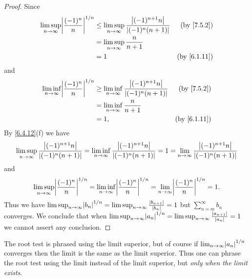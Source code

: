 \begin{proof}
  Since
  \begin{align*}
    \limsup_{n \to \infty} \abs{\frac{(-1)^n}{n}}^{1 / n} & \leq \limsup_{n \to \infty} \frac{\abs{(-1)^{n + 1} n}}{\abs{(-1)^n (n + 1)}} & \text{(by \cref{7.5.2})}  \\
                                                          & = \limsup_{n \to \infty} \frac{n}{n + 1}                                                                  \\
                                                          & = 1                                                                           & \text{(by \cref{6.1.11})}
  \end{align*}
  and
  \begin{align*}
    \liminf_{n \to \infty} \abs{\frac{(-1)^n}{n}}^{1 / n} & \geq \liminf_{n \to \infty} \frac{\abs{(-1)^{n + 1} n}}{\abs{(-1)^n (n + 1)}} & \text{(by \cref{7.5.2})}  \\
                                                          & = \liminf_{n \to \infty} \frac{n}{n + 1}                                                                  \\
                                                          & = 1,                                                                          & \text{(by \cref{6.1.11})}
  \end{align*}
  By \cref{6.4.12}(f) we have
  \[
    \limsup_{n \to \infty} \frac{\left\lvert(-1)^{n + 1} n\right\rvert}{\left\lvert(-1)^n (n + 1)\right\rvert} = \liminf_{n \to \infty} \frac{\left\lvert(-1)^{n + 1} n\right\rvert}{\left\lvert(-1)^n (n + 1)\right\rvert} = 1 = \lim_{n \to \infty} \frac{\left\lvert(-1)^{n + 1} n\right\rvert}{\left\lvert(-1)^n (n + 1)\right\rvert}
  \]
  and
  \[
    \limsup_{n \to \infty} \abs{\frac{(-1)^n}{n}}^{1 / n} = \liminf_{n \to \infty} \abs{\frac{(-1)^n}{n}}^{1 / n} = \lim_{n \to \infty} \abs{\frac{(-1)^n}{n}}^{1 / n} = 1.
  \]
  Thus we have \(\limsup_{n \to \infty} \abs{b_n}^{1 / n} = \limsup_{n \to \infty} \frac{\abs{b_{n + 1}}}{\abs{b_n}} = 1\) but \(\sum_{n = m}^\infty b_n\) converges.
  We conclude that when \(\limsup_{n \to \infty} \abs{a_n}^{1 / n} = \limsup_{n \to \infty} \frac{\abs{a_{n + 1}}}{\abs{a_n}} = 1\) we cannot assert any conclusion.
\end{proof}

\begin{note}
  The root test is phrased using the limit superior, but of course if \(\lim_{n \to \infty} \abs{a_n}^{1 / n}\) converges then the limit is the same as the limit superior.
  Thus one can phrase the root test using the limit instead of the limit superior, but \emph{only when the limit exists}.
\end{note}


